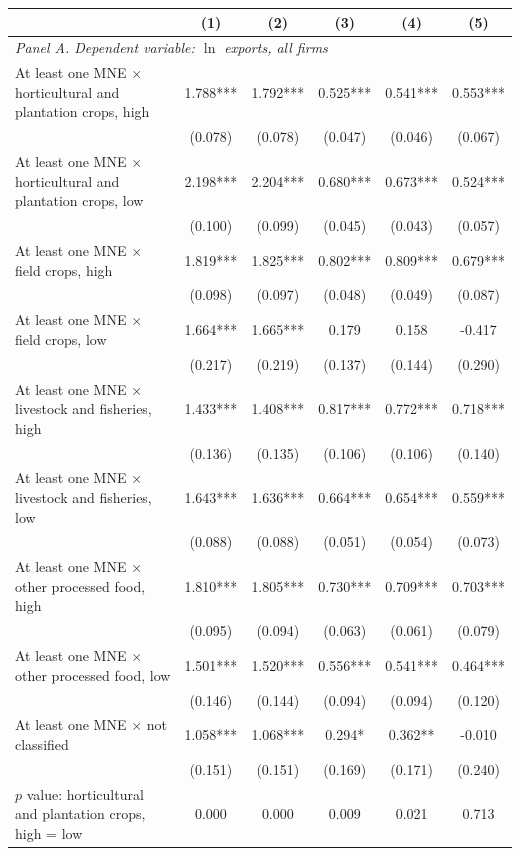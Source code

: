 \begin{tabular}{l*{5}{c}}
\toprule
 & (1) & (2) & (3) & (4) & (5) \\
\midrule
\multicolumn{6}{l}{\textit{Panel A. Dependent variable: $\ln$ exports, all firms}} \\
At least one MNE $\times$ horticultural and plantation crops, high & 1.788*** & 1.792*** & 0.525*** & 0.541*** & 0.553*** \\
 & (0.078) & (0.078) & (0.047) & (0.046) & (0.067) \\
At least one MNE $\times$ horticultural and plantation crops, low & 2.198*** & 2.204*** & 0.680*** & 0.673*** & 0.524*** \\
 & (0.100) & (0.099) & (0.045) & (0.043) & (0.057) \\
At least one MNE $\times$ field crops, high & 1.819*** & 1.825*** & 0.802*** & 0.809*** & 0.679*** \\
 & (0.098) & (0.097) & (0.048) & (0.049) & (0.087) \\
At least one MNE $\times$ field crops, low & 1.664*** & 1.665*** & 0.179 & 0.158 & -0.417 \\
 & (0.217) & (0.219) & (0.137) & (0.144) & (0.290) \\
At least one MNE $\times$ livestock and fisheries, high & 1.433*** & 1.408*** & 0.817*** & 0.772*** & 0.718*** \\
 & (0.136) & (0.135) & (0.106) & (0.106) & (0.140) \\
At least one MNE $\times$ livestock and fisheries, low & 1.643*** & 1.636*** & 0.664*** & 0.654*** & 0.559*** \\
 & (0.088) & (0.088) & (0.051) & (0.054) & (0.073) \\
At least one MNE $\times$ other processed food, high & 1.810*** & 1.805*** & 0.730*** & 0.709*** & 0.703*** \\
 & (0.095) & (0.094) & (0.063) & (0.061) & (0.079) \\
At least one MNE $\times$ other processed food, low & 1.501*** & 1.520*** & 0.556*** & 0.541*** & 0.464*** \\
 & (0.146) & (0.144) & (0.094) & (0.094) & (0.120) \\
At least one MNE $\times$ not classified & 1.058*** & 1.068*** & 0.294* & 0.362** & -0.010 \\
 & (0.151) & (0.151) & (0.169) & (0.171) & (0.240) \\
$p$ value: horticultural and plantation crops, high = low & 0.000 & 0.000 & 0.009 & 0.021 & 0.713 \\

\end{tabular}
